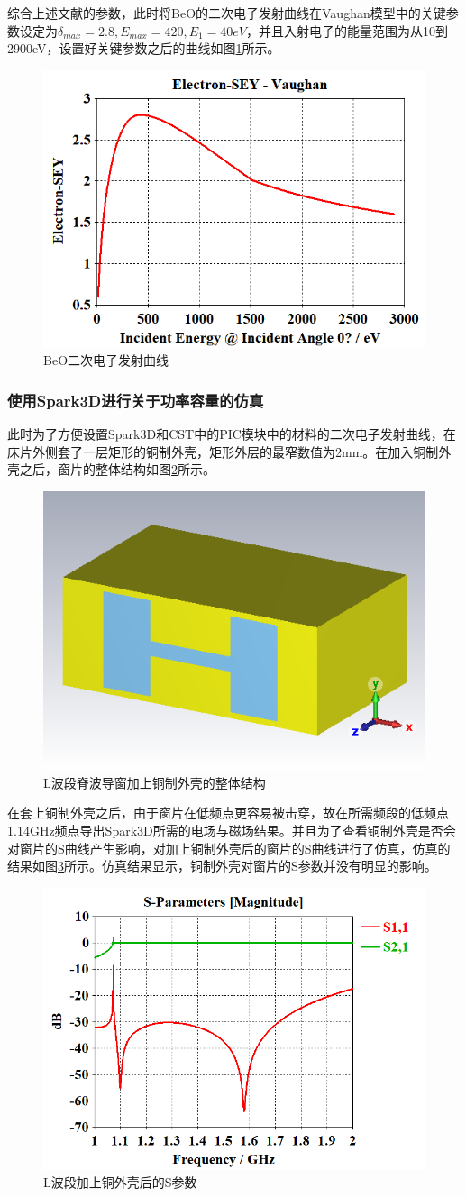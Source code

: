\documentclass[master]{thesis-uestc}
\begin{document}
综合上述文献的参数，此时将BeO的二次电子发射曲线在Vaughan模型中的关键参数设定为$\delta_{max}=2.8 , E_{max}=420 , E_1 = 40 eV$，并且入射电子的能量范围为从10到2900eV，设置好关键参数之后的曲线如图\ref{fig:BeO二次电子发射曲线}所示。
\begin{figure}[!htb]
    \centering
    \includegraphics[width=0.3\linewidth]{pic/chapter4/BeO二次电子发射曲线.png}
    \caption{BeO二次电子发射曲线}
    \label{fig:BeO二次电子发射曲线}
\end{figure}

\subsubsection{使用Spark3D进行关于功率容量的仿真}
此时为了方便设置Spark3D和CST中的PIC模块中的材料的二次电子发射曲线，在床片外侧套了一层矩形的铜制外壳，矩形外层的最窄数值为2mm。在加入铜制外壳之后，窗片的整体结构如图\ref{fig:L波段加上铜制外壳}所示。

\begin{figure}[!htb]
    \centering
    \includegraphics[width=0.3\linewidth]{pic/chapter4/L波段加上铜制外壳.png}
    \caption{L波段脊波导窗加上铜制外壳的整体结构}
    \label{fig:L波段加上铜制外壳}
\end{figure}

在套上铜制外壳之后，由于窗片在低频点更容易被击穿，故在所需频段的低频点1.14GHz频点导出Spark3D所需的电场与磁场结果。并且为了查看铜制外壳是否会对窗片的S曲线产生影响，对加上铜制外壳后的窗片的S曲线进行了仿真，仿真的结果如图\ref{fig:L波段加上铜外壳后的S参数}所示。仿真结果显示，铜制外壳对窗片的S参数并没有明显的影响。

\begin{figure}[!htb]
    \centering
    \includegraphics[width=0.45\linewidth]{pic/chapter4/L波段加上铜外壳后的S参数.png}
    \caption{L波段加上铜外壳后的S参数}
    \label{fig:L波段加上铜外壳后的S参数}
\end{figure}
\end{document}

